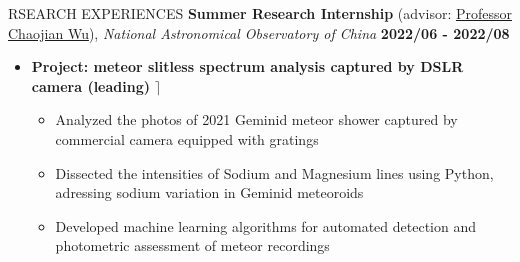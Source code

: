 \documentclass[10pt]{article} %
\begin{document}
\begin{section}{RSEARCH EXPERIENCES}
\textbf{Summer Research Internship} (advisor: \href{mailto:chjwu@bao.ac.cn}{Professor Chaojian Wu}), \textit{National Astronomical Observatory of China} \hfill \textbf{2022/06 - 2022/08} 
\begin{itemize}[leftmargin=1.5em]
    \item \textbf{Project: meteor slitless spectrum analysis captured by DSLR camera (leading)} \hfill $\rceil$
    \begin{itemize}[leftmargin=1.5em]
        \item Analyzed the photos of 2021 Geminid meteor shower captured by commercial camera equipped with gratings
        \item Dissected the intensities of Sodium and Magnesium lines using Python, adressing sodium variation in Geminid meteoroids
        \item Developed machine learning algorithms for automated detection and photometric assessment of meteor recordings
    \end{itemize}
\end{itemize}


\end{section}
\end{document}
